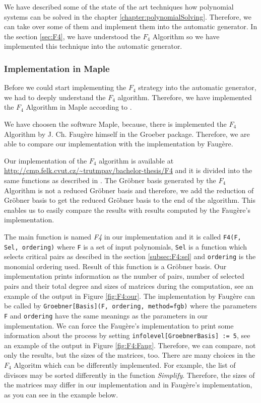 We have described some of the state of the art techniques how polynomial systems can be solved in the chapter \ref{chapter:polynomialSolving}. Therefore, we can take over some of them and implement them into the automatic generator. In the section \ref{sec:F4}, we have understood the $F_4$ \cite{F4} Algorithm so we have implemented this technique into the automatic generator.

\subsubsection{Implementation in Maple}
Before we could start implementing the $F_4$ strategy into the automatic generator, we had to deeply understand the $F_4$ algorithm. Therefore, we have implemented the $F_4$ Algorithm in Maple according to \cite{F4}. 

We have choosen the software Maple, because, there is implemented the $F_4$ Algorithm by J. Ch. Faug\`ere himself in the Groeber package. Therefore, we are able to compare our implementation with the implementation by Faug\`ere.

Our implementation of the $F_4$ algorithm is available at \url{http://cmp.felk.cvut.cz/~trutmpav/bachelor-thesis/F4} and it is divided into the same functions as described in \cite{F4}. The Gr\"obner basis generated by the $F_4$ Algorithm is not a reduced Gr\"obner basis and therefore, we add the reduction of Gr\"obner basis to get the reduced Gr\"obner basis to the end of the algorithm. This enables us to easily compare the results with results computed by the Faug\`ere's implementation.

The main function is named \textit{F4} in our implementation and it is called \texttt{F4(F, Sel, ordering)} where \texttt{F} is a set of input polynomials, \texttt{Sel} is a function which selects critical pairs as descibed in the section \ref{subsec:F4:sel} and \texttt{ordering} is the monomial ordering used. Result of this function is a Gr\"obner basis. Our implementation prints information as the number of pairs, number of selected pairs and their total degree and sizes of matrices during the computation, see an example of the output in Figure \ref{fig:F4:our}. The implementation by Faug\`ere can be called by \texttt{Groebner[Basis](F, ordering, method=fgb)} where the parameters \texttt{F} and \texttt{ordering} have the same meanings as the parameters in our implementation. We can force the Faug\`ere's implementation to print some information about the process by setting \texttt{infolevel[GroebnerBasis] := 5}, see an example of the output in Figure \ref{fig:F4:Faug}. Therefore, we can compare, not only the results, but the sizes of the matrices, too. There are many choices in the $F_4$ Algoritm which can be differently implemented. For example, the list of divisors may be sorted differently in the function \textit{Simplify}. Therefore, the sizes of the matrices may differ in our implementation and in Faug\`ere's implementation, as you can see in the example below.

